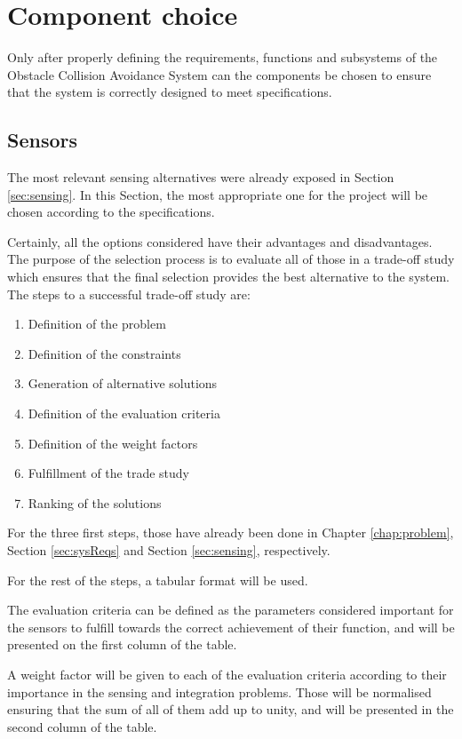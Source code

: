 \section{Component choice}

Only after properly defining the requirements, functions and subsystems of the Obstacle Collision Avoidance System can the components be chosen to ensure that the system is correctly designed to meet specifications.

\subsection{Sensors}

The most relevant sensing alternatives were already exposed in Section \ref{sec:sensing}.
In this Section, the most appropriate one for the project will be chosen according to the specifications.

Certainly, all the options considered have their advantages and disadvantages.
The purpose of the selection process is to evaluate all of those in a trade-off study which ensures that the final selection provides the best alternative to the system.
The steps to a successful trade-off study are:
\begin{enumerate}
	\item Definition of the problem
	\item Definition of the constraints
	\item Generation of alternative solutions
	\item Definition of the evaluation criteria
	\item Definition of the weight factors
	\item Fulfillment of the trade study
	\item Ranking of the solutions
\end{enumerate}

For the three first steps, those have already been done in Chapter \ref{chap:problem}, Section \ref{sec:sysReqs} and Section \ref{sec:sensing}, respectively.

For the rest of the steps, a tabular format will be used.

The evaluation criteria can be defined as the parameters considered important for the sensors to fulfill towards the correct achievement of their function, and will be presented on the first column of the table.

A weight factor will be given to each of the evaluation criteria according to their importance in the sensing and integration problems.
Those will be normalised ensuring that the sum of all of them add up to unity, and will be presented in the second column of the table.

